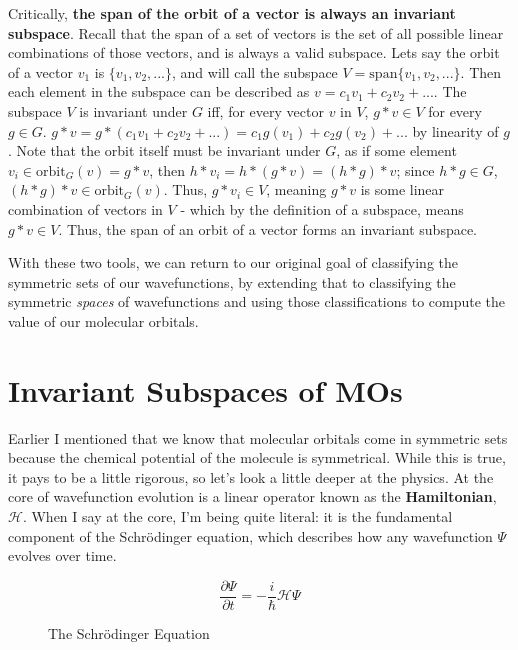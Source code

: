 \documentclass{article}
\newcommand{\ham}{\mathcal{H}}
\begin{document}
Critically, \textbf{the span of the orbit of a vector is always an invariant subspace}. Recall that the span of a set of vectors is the set of all possible linear combinations of those vectors, and is always a valid subspace. Lets say the orbit of a vector $v_1$ is $\{v_1, v_2, ...\}$, and will call the subspace $V = \text{span}\{v_1, v_2, ...\}$. Then each element in the subspace can be described as $v = c_1v_1  + c_2v_2 + ...$. The subspace $V$ is invariant under $G$ iff, for every vector $v$ in $V$, $g*v \in V$ for every $g \in G$. $g*v = g*(c_1v_1 + c_2v_2 + ...) = c_1g(v_1) + c_2g(v_2) + ...$ by linearity of $g$. Note that the orbit itself must be invariant under $G$, as if some element $v_i \in \text{orbit}_G(v) = g*v$, then $h*v_i = h*(g*v) = (h*g)*v$; since $h*g \in G$, $(h*g)*v \in \text{orbit}_G(v)$. Thus, $g*v_i \in V$, meaning $g*v$ is some linear combination of vectors in $V$ - which by the definition of a subspace, means $g*v \in V$. Thus, the span of an orbit of a vector forms an invariant subspace. 

With these two tools, we can return to our original goal of classifying the symmetric sets of our wavefunctions, by extending that to classifying the symmetric \textit{spaces} of wavefunctions and using those classifications to compute the value of our molecular orbitals.

\section{Invariant Subspaces of MOs}
Earlier I mentioned that we know that molecular orbitals come in symmetric sets because the chemical potential of the molecule is symmetrical. While this is true, it pays to be a little rigorous, so let's look a little deeper at the physics. At the core of wavefunction evolution is a linear operator known as the \textbf{Hamiltonian}, $\ham$. When I say at the core, I'm being quite literal: it is the fundamental component of the Schr\"odinger equation, which describes how any wavefunction $\Psi$ evolves over time.
\begin{figure}[H]
    \centering
    \begin{equation}
        \frac{\partial{\Psi}}{\partial{t}} = -\frac{i}{\hbar}\ham\Psi
    \end{equation}
    \caption{The Schr{\"o}dinger Equation}
    \label{fig:schrodinger}
\end{figure}
\end{document}
